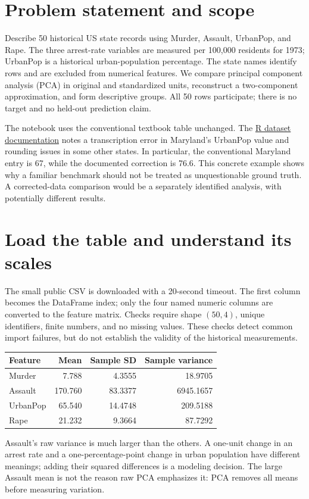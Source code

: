 

\section*{Problem statement and scope}
Describe 50 historical US state records using Murder, Assault, UrbanPop, and Rape.
The three arrest-rate variables are measured per 100,000 residents for 1973; UrbanPop is a historical urban-population percentage.
The state names identify rows and are excluded from numerical features.
We compare principal component analysis (PCA) in original and standardized units, reconstruct a two-component approximation,
and form descriptive groups. All 50 rows participate; there is no target and no held-out prediction claim.

The notebook uses the conventional textbook table unchanged. The
\href{https://stat.ethz.ch/R-manual/R-devel/library/datasets/html/USArrests.html}{R dataset documentation}
notes a transcription error in Maryland's UrbanPop value and rounding issues in some other states.
In particular, the conventional Maryland entry is 67, while the documented correction is 76.6.
This concrete example shows why a familiar benchmark should not be treated as unquestionable ground truth.
A corrected-data comparison would be a separately identified analysis, with potentially different results.

\section{Load the table and understand its scales}
The small public CSV is downloaded with a 20-second timeout. The first column becomes the DataFrame index;
only the four named numeric columns are converted to the feature matrix.
Checks require shape $(50,4)$, unique identifiers, finite numbers, and no missing values.
These checks detect common import failures, but do not establish the validity of the historical measurements.

\begin{center}\begin{tabular}{lrrr}\toprule
Feature&Mean&Sample SD&Sample variance\\\midrule
Murder&7.788&4.3555&18.9705\\
Assault&170.760&83.3377&6945.1657\\
UrbanPop&65.540&14.4748&209.5188\\
Rape&21.232&9.3664&87.7292\\\bottomrule\end{tabular}\end{center}
Assault's raw variance is much larger than the others. A one-unit change in an arrest rate and a one-percentage-point change
in urban population have different meanings; adding their squared differences is a modeling decision.
The large Assault mean is not the reason raw PCA emphasizes it: PCA removes all means before measuring variation.

